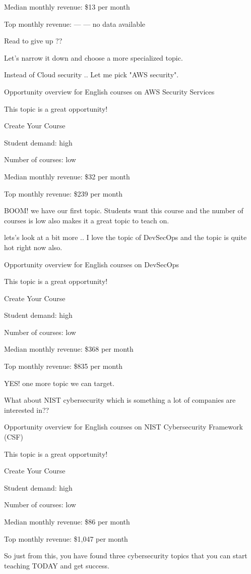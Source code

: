 \documentclass[11pt]{article}
\begin{document}
Median monthly revenue: \$13 per month

Top monthly revenue: — — no data available

Read to give up ??

Let's narrow it down and choose a more specialized topic.

Instead of Cloud security .. Let me pick "AWS security".

Opportunity overview for English courses on AWS Security Services

This topic is a great opportunity!

Create Your Course

Student demand: high

Number of courses: low

Median monthly revenue: \$32 per month

Top monthly revenue: \$239 per month

BOOM! we have our first topic. Students want this course and the number of courses is low also makes it a great topic to teach on.

lets's look at a bit more .. I love the topic of DevSecOps and the topic is quite hot right now also.

Opportunity overview for English courses on DevSecOps

This topic is a great opportunity!

Create Your Course

Student demand: high

Number of courses: low

Median monthly revenue: \$368 per month

Top monthly revenue: \$835 per month

YES! one more topic we can target.

What about NIST cybersecurity which is something a lot of companies are interested in??

Opportunity overview for English courses on NIST Cybersecurity Framework (CSF)

This topic is a great opportunity!

Create Your Course

Student demand: high

Number of courses: low

Median monthly revenue: \$86 per month

Top monthly revenue: \$1,047 per month

So just from this, you have found three cybersecurity topics that you can start teaching TODAY and get success.
\end{document}
